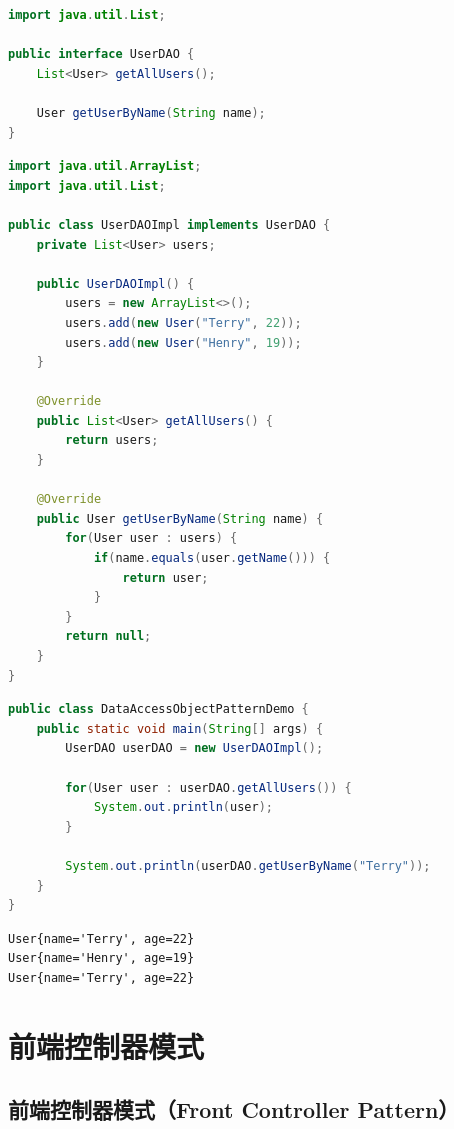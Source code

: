 \begin{lstlisting}[language=Java, title=UserDAO.java]
import java.util.List;

public interface UserDAO {
	List<User> getAllUsers();

	User getUserByName(String name);
}
\end{lstlisting}

\begin{lstlisting}[language=Java, title=UserDAOImpl.java]
import java.util.ArrayList;
import java.util.List;

public class UserDAOImpl implements UserDAO {
	private List<User> users;

	public UserDAOImpl() {
		users = new ArrayList<>();
		users.add(new User("Terry", 22));
		users.add(new User("Henry", 19));
	}

	@Override
	public List<User> getAllUsers() {
		return users;
	}

	@Override
	public User getUserByName(String name) {
		for(User user : users) {
			if(name.equals(user.getName())) {
				return user;
			}
		}
		return null;
	}
}	
\end{lstlisting}

\begin{lstlisting}[language=Java, title=DataAccessObjectPatternDemo.java]
public class DataAccessObjectPatternDemo {
	public static void main(String[] args) {
		UserDAO userDAO = new UserDAOImpl();

		for(User user : userDAO.getAllUsers()) {
			System.out.println(user);
		}

		System.out.println(userDAO.getUserByName("Terry"));
	}
}
\end{lstlisting}

\begin{tcolorbox}
    \begin{verbatim}
User{name='Terry', age=22}
User{name='Henry', age=19}
User{name='Terry', age=22}
\end{verbatim}
\end{tcolorbox}

\newpage

\section{前端控制器模式}

\subsection{前端控制器模式（Front Controller Pattern）}


